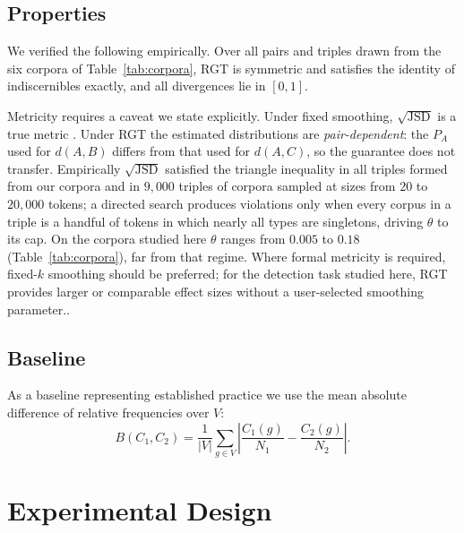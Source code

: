 \documentclass[conference]{IEEEtran}
\begin{document}
\subsection{Properties}
\label{sec:props}
We verified the following empirically. Over all pairs and triples drawn from the
six corpora of Table~\ref{tab:corpora}, RGT is symmetric and satisfies the
identity of indiscernibles exactly, and all divergences lie in $[0,1]$.

Metricity requires a caveat we state explicitly. Under fixed smoothing,
$\sqrt{\mathrm{JSD}}$ is a true metric \cite{endres2003}. Under RGT the estimated
distributions are \emph{pair-dependent}: the $P_A$ used for $d(A,B)$ differs from
that used for $d(A,C)$, so the guarantee does not transfer. Empirically
$\sqrt{\mathrm{JSD}}$ satisfied the triangle inequality in all triples formed from
our corpora and in $9{,}000$ triples of corpora sampled at sizes from $20$ to
$20{,}000$ tokens; a directed search produces violations only when every corpus
in a triple is a handful of tokens in which nearly all types are singletons,
driving $\theta$ to its cap. On the corpora studied here $\theta$ ranges from
$0.005$ to $0.18$ (Table~\ref{tab:corpora}), far from that regime. Where formal
metricity is required, fixed-$k$ smoothing should be preferred; for the detection 
task studied here, RGT provides larger or comparable effect sizes without a 
user-selected smoothing parameter..

\subsection{Baseline}
As a baseline representing established practice we use the mean absolute
difference of relative frequencies over $V$:
\begin{equation}
B(C_1,C_2) = \frac{1}{|V|}\sum_{g \in V}
  \left| \frac{C_1(g)}{N_1} - \frac{C_2(g)}{N_2} \right| .
\end{equation}

\section{Experimental Design}
\label{sec:design}
\end{document}
